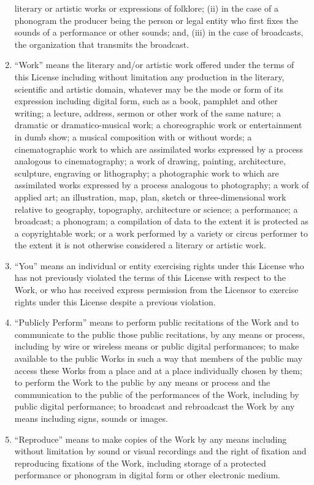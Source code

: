 \begin{enumerate}
       literary or artistic works or expressions of folklore; (ii) in
       the case of a phonogram the producer being the person or legal
       entity who first fixes the sounds of a performance or other
       sounds; and, (iii) in the case of broadcasts, the organization
       that transmits the broadcast.
 \item ``Work'' means the literary and/or artistic work offered under
       the terms of this License including without limitation any
       production in the literary, scientific and artistic domain,
       whatever may be the mode or form of its expression including
       digital form, such as a book, pamphlet and other writing; a
       lecture, address, sermon or other work of the same nature; a
       dramatic or dramatico-musical work; a choreographic work or
       entertainment in dumb show; a musical composition with or without
       words; a cinematographic work to which are assimilated works
       expressed by a process analogous to cinematography; a work of
       drawing, painting, architecture, sculpture, engraving or
       lithography; a photographic work to which are assimilated works
       expressed by a process analogous to photography; a work of
       applied art; an illustration, map, plan, sketch or
       three-dimensional work relative to geography, topography,
       architecture or science; a performance; a broadcast; a phonogram;
       a compilation of data to the extent it is protected as a
       copyrightable work; or a work performed by a variety or circus
       performer to the extent it is not otherwise considered a literary
       or artistic work.
 \item ``You'' means an individual or entity exercising rights under
       this License who has not previously violated the terms of this
       License with respect to the Work, or who has received express
       permission from the Licensor to exercise rights under this
       License despite a previous violation.
 \item ``Publicly Perform'' means to perform public recitations of the
       Work and to communicate to the public those public recitations,
       by any means or process, including by wire or wireless means or
       public digital performances; to make available to the public
       Works in such a way that members of the public may access these
       Works from a place and at a place individually chosen by them; to
       perform the Work to the public by any means or process and the
       communication to the public of the performances of the Work,
       including by public digital performance; to broadcast and
       rebroadcast the Work by any means including signs, sounds or
       images.
 \item ``Reproduce'' means to make copies of the Work by any means
       including without limitation by sound or visual recordings and
       the right of fixation and reproducing fixations of the Work,
       including storage of a protected performance or phonogram in
       digital form or other electronic medium.
\end{enumerate}



